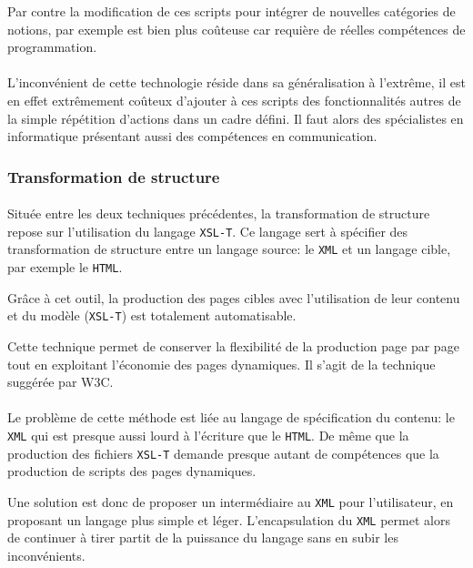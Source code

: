 Par contre la modification de ces scripts pour intégrer de nouvelles catégories de notions, par exemple est bien plus coûteuse car requière de réelles compétences de programmation.

\paragraph{}L'inconvénient de cette technologie réside dans sa généralisation à l'extrême, il est en effet extrêmement coûteux d'ajouter à ces scripts des fonctionnalités autres de la simple répétition d'actions dans un cadre défini. Il faut alors des spécialistes en informatique présentant aussi des compétences en communication. 

\subsubsection{Transformation de structure}
\paragraph{}Située entre les deux techniques précédentes, la transformation de structure repose sur l'utilisation du langage \texttt{XSL-T}. Ce langage sert à spécifier des transformation de structure entre un langage source: le \texttt{XML} et un langage cible, par exemple le \texttt{HTML}. 

Grâce à cet outil, la production des pages cibles avec l'utilisation de leur contenu et du modèle (\texttt{XSL-T}) est totalement automatisable.

Cette technique permet de conserver la flexibilité de la production page par page tout en exploitant l'économie des pages dynamiques. Il s'agit de la technique suggérée par W3C.

\paragraph{}Le problème de cette méthode est liée au langage de spécification du contenu: le \texttt{XML} qui est presque aussi lourd à l'écriture que le \texttt{HTML}. De même que la production des fichiers \texttt{XSL-T} demande presque autant de compétences que la production de scripts des pages dynamiques.

Une solution est donc de proposer un intermédiaire au \texttt{XML} pour l'utilisateur, en proposant un langage plus simple et léger. L'encapsulation du \texttt{XML} permet alors de continuer à tirer partit de la puissance du langage sans en subir les inconvénients. 
